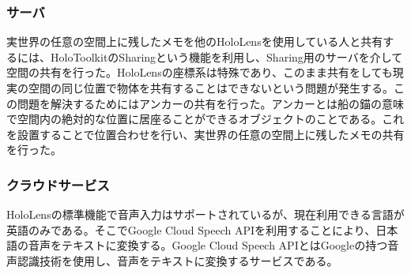 \documentclass[technicalreport]{ieicej}
\begin{document}
\subsubsection{サーバ}
実世界の任意の空間上に残したメモを他のHoloLensを使用している人と共有するには、HoloToolkitのSharingという機能を利用し、Sharing用のサーバを介して空間の共有を行った。HoloLensの座標系は特殊であり、このまま共有をしても現実の空間の同じ位置で物体を共有することはできないという問題が発生する。この問題を解決するためにはアンカーの共有を行った。アンカーとは船の錨の意味で空間内の絶対的な位置に居座ることができるオブジェクトのことである。これを設置することで位置合わせを行い、実世界の任意の空間上に残したメモの共有を行った。

\subsubsection{クラウドサービス}
HoloLensの標準機能で音声入力はサポートされているが、現在利用できる言語が英語のみである。そこでGoogle Cloud Speech APIを利用することにより、日本語の音声をテキストに変換する。Google Cloud Speech APIとはGoogleの持つ音声認識技術を使用し、音声をテキストに変換するサービスである。


%
%
\begin{thebibliography}{99}%
\bibitem{}
\end{thebibliography}
\end{document}
